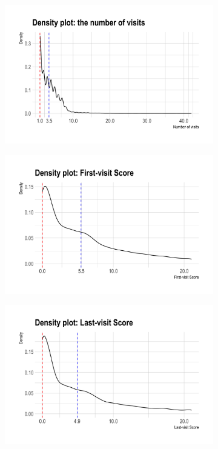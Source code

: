 \documentclass[11pt]{article}
\begin{document}
\begin{figure}[htb!]
	\caption{Density plots: the full dataset}\label{fig:picture1}
	\begin{subfigure}[h]{0.48\linewidth}
		\includegraphics[width=\linewidth]{Figures/p1.png}
		\caption{}\label{fig:p1}
	\end{subfigure}
	\hfill
	\begin{subfigure}[h]{0.48\linewidth}
		\includegraphics[width=\linewidth]{Figures/p2.png}
		\caption{}\label{fig:p2}
	\end{subfigure}
	\hfill
	\begin{subfigure}[h]{0.48\linewidth}
		\includegraphics[width=\linewidth]{Figures/p3.png}

\end{subfigure}
\end{figure}
\end{document}
